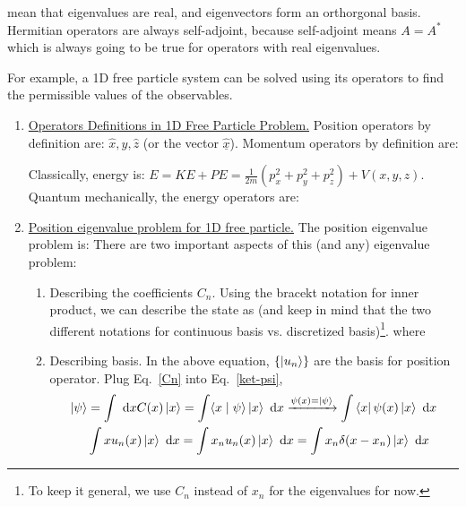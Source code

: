 \documentclass{school-22.101-notes}
\begin{document}
 mean that eigenvalues are real, and eigenvectors form an orthorgonal basis. Hermitian operators are always self-adjoint, because self-adjoint means $A = A^*$ which is always going to be true for operators with real eigenvalues. 


For example, a 1D free particle system can be solved using its operators to find the permissible values of the observables. 
\begin{enumerate}
\item \uline{Operators Definitions in 1D Free Particle Problem.} Position operators by definition are: $\hat{x}, \hat{y}, \hat{z}$ (or the vector $\hat{\underline{x}}$). Momentum operators by definition are:

  Classically, energy is: $E = KE + PE = \frac{1}{2m} (p_x^2 + p_y^2 + p_z^2) + V(x,y,z)$. Quantum mechanically, the energy operators are:



\item \uline{Position eigenvalue problem for 1D free particle.} The position eigenvalue problem is:
  There are two important aspects of this (and any) eigenvalue problem: 
  \begin{enumerate}
  \item Describing the coefficients $C_n$. Using the bracekt notation for inner product, we can describe the state as (and keep in mind that the two different notations for continuous basis vs. discretized basis)\footnote{To keep it general, we use $C_n$ instead of $x_n$ for the eigenvalues for now.}. 
    where 


  \item Describing basis. In the above equation, $\left\{ \left| u_n \right> \right\}$ are the basis for position operator. 
    Plug Eq.~\ref{Cn} into Eq.~\ref{ket-psi}, 
    \begin{align}
      \left| \psi \right> &= \int \mbox{ }\mathrm{d} x C(x) \left| x \right> = \int \langle x \mid \psi \rangle \left| x \right> \mbox{ }\mathrm{d} x \xrightarrow{\psi(x) = \left| \psi \right>} \int \left< x \right| \psi(x) \left| x \right> \mbox{ }\mathrm{d} x \\
      &\int x u_n(x)\left| x \right> \mbox{ }\mathrm{d} x = \int x_n u_n (x) \left| x \right> \mbox{ }\mathrm{d} x = \int x_n \delta (x-x_n) \left| x \right> \mbox{ }\mathrm{d} x 
    \end{align}


\end{enumerate}
\end{enumerate}
\end{document}

